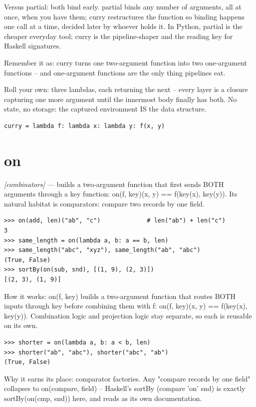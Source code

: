 \documentclass[11pt,letterpaper]{book}
\begin{document}
Versus partial: both bind early. partial binds any number of arguments, all at once, when you have them; curry restructures the function so binding happens one call at a time, decided later by whoever holds it. In Python, partial is the cheaper everyday tool; curry is the pipeline-shaper and the reading key for Haskell signatures.


Remember it as: curry turns one two-argument function into two one-argument functions -- and one-argument functions are the only thing pipelines eat.


Roll your own: three lambdas, each returning the next -- every layer is a closure capturing one more argument until the innermost body finally has both. No state, no storage: the captured environment IS the data structure.

\begin{lstlisting}[style=code]
curry = lambda f: lambda x: lambda y: f(x, y)
\end{lstlisting}

\section{on}
\noindent\textit{[combinators]} --- builds a two-argument function that first sends BOTH arguments through a key function: on(f, key)(x, y) == f(key(x), key(y)). Its natural habitat is comparators: compare two records by one field.
\begin{lstlisting}[style=spec]
>>> on(add, len)("ab", "c")             # len("ab") + len("c")
3
>>> same_length = on(lambda a, b: a == b, len)
>>> same_length("abc", "xyz"), same_length("ab", "abc")
(True, False)
>>> sortBy(on(sub, snd), [(1, 9), (2, 3)])
[(2, 3), (1, 9)]
\end{lstlisting}

How it works: on(f, key) builds a two-argument function that routes BOTH inputs through key before combining them with f: on(f, key)(x, y) == f(key(x), key(y)). Combination logic and projection logic stay separate, so each is reusable on its own.

\begin{lstlisting}[style=spec]
>>> shorter = on(lambda a, b: a < b, len)
>>> shorter("ab", "abc"), shorter("abc", "ab")
(True, False)
\end{lstlisting}

Why it earns its place: comparator factories. Any "compare records by one field" collapses to on(compare, field) -- Haskell's sortBy (compare 'on' snd) is exactly sortBy(on(cmp, snd)) here, and reads as its own documentation.
\end{document}

